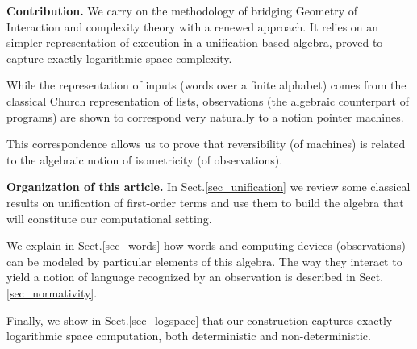 

\smallskip

\bigskip\noindent
\textbf{Contribution.}
We carry on the methodology of bridging Geometry of Interaction and complexity theory with a renewed approach.
It relies on an simpler representation of execution in a unification-based algebra, proved to capture exactly logarithmic space complexity.

While the representation of inputs (words over a finite alphabet) comes from the classical Church representation of lists, observations (the algebraic counterpart of programs) are shown to correspond  very naturally to a notion pointer machines.

This correspondence allows us to prove that reversibility (of machines) is related to the algebraic notion of isometricity (of observations).




\smallskip\noindent
\textbf{Organization of this article.} In Sect.\ref{sec_unification} we review some classical results on unification of first-order terms and use them to build the algebra that will constitute our computational setting.

We explain in Sect.\ref{sec_words} how words and computing devices (observations) can be modeled by particular elements of this algebra.
The way they interact to yield a notion of language recognized by an observation is described in Sect.\ref{sec_normativity}.

Finally, we show in Sect.\ref{sec_logspace} that our construction captures exactly logarithmic space computation, both deterministic and non-deterministic.

\vspace{-2mm}

